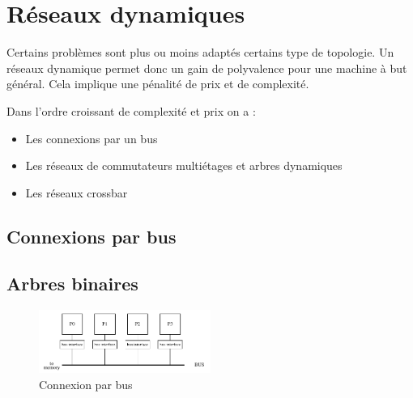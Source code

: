 \documentclass[12pt,a4paper,oneside, titlepage]{article}
\begin{document}
  \section*{Réseaux dynamiques}

    Certains problèmes sont plus ou moins adaptés  certains type de topologie.
    Un réseaux dynamique permet donc un gain de polyvalence pour une machine à but général.
    Cela implique une pénalité de prix et de complexité.

    Dans l'ordre croissant de complexité et prix on a :

    \begin{itemize}
      \item  Les connexions par un bus
      \item  Les réseaux de commutateurs multiétages et arbres dynamiques
      \item  Les réseaux crossbar
    \end{itemize}

    \subsection*{Connexions par bus}

    \subsection*{Arbres binaires}

      \begin{figure}[H]
        \centering
        \includegraphics[width=0.5\textwidth]{images/bus}
        \caption{Connexion par bus}
      \end{figure}
\end{document}
